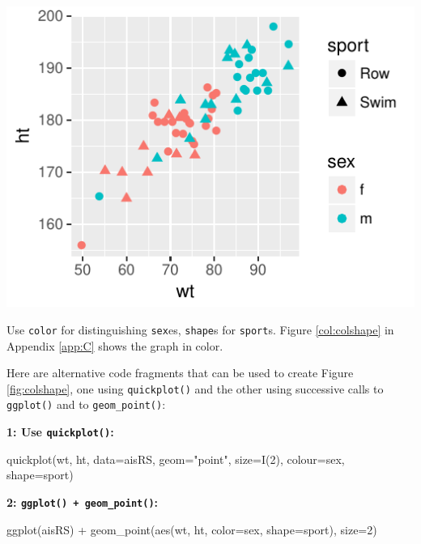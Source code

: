 \documentclass{tufte-book}\usepackage[]{graphicx}\usepackage[]{color}
\newcommand{\txtt}[1]{\texttt{#1}}
\begin{document}
\begin{marginfigure}[-72pt]
\begin{Schunk}


\centerline{\includegraphics[width=\textwidth]{figs/09-quick-rs1-1} }

\end{Schunk}
\caption{Use \texttt{color} for distinguishing \texttt{sex}es,
\texttt{shape}s for \texttt{sport}s.
Figure \ref{col:colshape} in Appendix \ref{app:C}
shows the graph in color.}\label{fig:colshape}

\end{marginfigure}

Here are alternative code fragments that can be used to create
Figure \ref{fig:colshape}, one using \txtt{quickplot()} and the other
using successive calls to \txtt{ggplot()} and to \txtt{geom\_point()}:
\vspace*{9pt}

\begin{fullwidth}
\begin{minipage}[t]{0.36\linewidth}
{\bf 1: Use \txtt{quickplot()}:}
\begin{Schunk}
\begin{Sinput}
quickplot(wt, ht,
          data=aisRS,
          geom="point",
          size=I(2),
          colour=sex,
          shape=sport)
\end{Sinput}
\end{Schunk}
\end{minipage}
\hspace*{0.04\textwidth}
\begin{minipage}[t]{0.4\linewidth}
{\bf 2: \txtt{ggplot() + geom\_point()}:}
\begin{Schunk}
\begin{Sinput}
ggplot(aisRS) +
  geom_point(aes(wt, ht,
               color=sex,
               shape=sport),
             size=2)
\end{Sinput}
\end{Schunk}
\end{minipage}
\end{fullwidth}
\end{document}
